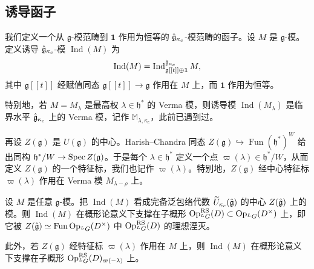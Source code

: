 \subsection{诱导函子}

我们定义一个从 $\mathfrak{g}$-模范畴到 $\mathbf{1}$ 作用为恒等的 $\hat{\mathfrak{g}}_{\kappa_c}$-模范畴的函子。设 $M$ 是 $\mathfrak{g}$-模。定义诱导 $\hat{\mathfrak{g}}_{\kappa_c}$-模 $\operatorname{Ind}(M)$ 为
\[
    \operatorname{Ind}(M)=\operatorname{Ind}^{\hat{\mathfrak{g}}_{\kappa_c}}_{\mathfrak{g}[[t]]\oplus\mathbf{1}}M,
\]
其中 $\mathfrak{g}[[t]]$ 经赋值同态 $\mathfrak{g}[[t]]\to\mathfrak{g}$ 作用在 $M$ 上，而 $\mathbf{1}$ 作用为恒等。

特别地，若 $M=M_\lambda$ 是最高权 $\lambda\in\mathfrak{h}^*$ 的 Verma 模，则诱导模 $\operatorname{Ind}(M_\lambda)$ 是临界水平 $\hat{\mathfrak{g}}_{\kappa_c}$ 上的 Verma 模，记作 $\mathbb{M}_{\lambda,\kappa_c}$，此前已遇到过。


再设 $Z(\mathfrak{g})$ 是 $U(\mathfrak{g})$ 的中心。Harish--Chandra 同态 $Z(\mathfrak{g})\hookrightarrow\operatorname{Fun}(\mathfrak{h}^*)^W$ 给出同构 $\mathfrak{h}^*/W\to\operatorname{Spec} Z(\mathfrak{g})$。于是每个 $\lambda\in\mathfrak{h}^*$ 定义一个点 $\varpi(\lambda)\in\mathfrak{h}^*/W$，从而定义 $Z(\mathfrak{g})$ 的一个特征标，我们也记作 $\varpi(\lambda)$。特别地，$Z(\mathfrak{g})$ 经中心特征标 $\varpi(\lambda)$ 作用在 Verma 模 $M_{\lambda-\rho}$ 上。

\begin{proposition}
    设 $M$ 是任意 $\mathfrak{g}$-模。把 $\operatorname{Ind}(M)$ 看成完备泛包络代数 $\widetilde{U}_{\kappa_c}(\hat{\mathfrak{g}})$ 的中心 $Z(\hat{\mathfrak{g}})$ 上的模。则 $\operatorname{Ind}(M)$ 在概形论意义下支撑在子概形 $\operatorname{Op}^{\mathrm{RS}}_{{}^LG}(D)\subset\operatorname{Op}_{{}^LG}(D^\times)$ 上，即它被 $Z(\hat{\mathfrak{g}})\simeq\operatorname{Fun}\operatorname{Op}_{{}^LG}(D^\times)$ 中 $\operatorname{Op}^{\mathrm{RS}}_{{}^LG}(D)$ 的理想湮灭。

    此外，若 $Z(\mathfrak{g})$ 经特征标 $\varpi(\lambda)$ 作用在 $M$ 上，则 $\operatorname{Ind}(M)$ 在概形论意义下支撑在子概形 $\operatorname{Op}^{\mathrm{RS}}_{{}^LG}(D)_{\varpi(-\lambda)}$ 上。
\end{proposition}

